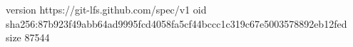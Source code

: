 version https://git-lfs.github.com/spec/v1
oid sha256:87b923f49abb64ad9995fcd4058fa5cf44bccc1c319c67e5003578892eb12fed
size 87544
